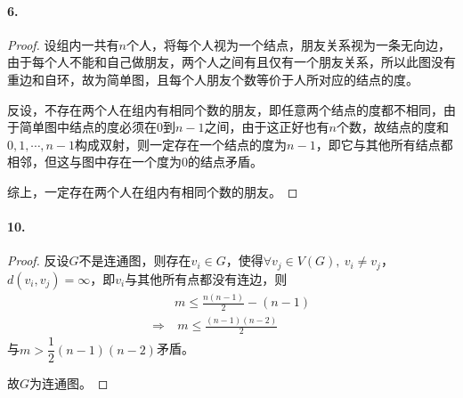 \documentclass[12pt, a4paper, oneside]{ctexart}
\begin{document}
\paragraph{6.}
\begin{proof}
    设组内一共有$n$个人，将每个人视为一个结点，朋友关系视为一条无向边，由于每个人不能和自己做朋友，两个人之间有且仅有一个朋友关系，所以此图没有重边和自环，故为简单图，且每个人朋友个数等价于人所对应的结点的度。

    反设，不存在两个人在组内有相同个数的朋友，即任意两个结点的度都不相同，由于简单图中结点的度必须在$0$到$n-1$之间，由于这正好也有$n$个数，故结点的度和$0,1,\cdots, n-1$构成双射，则一定存在一个结点的度为$n-1$，即它与其他所有结点都相邻，但这与图中存在一个度为$0$的结点矛盾。

    综上，一定存在两个人在组内有相同个数的朋友。
\end{proof}
\paragraph{10.}\begin{proof}
    反设$G$不是连通图，则存在$v_i\in G$，使得$\forall v_j \in V(G),\ v_i\neq v_j$，$d(v_i,v_j) = \infty$，即$v_i$与其他所有点都没有连边，则
    \begin{equation*}
        \begin{aligned}
            &m\leqslant \frac{n(n-1)}{2}-(n-1)\\
            \Rightarrow&\ m\leqslant \frac{(n-1)(n-2)}{2}
        \end{aligned}
    \end{equation*}
    与$m > \dfrac{1}{2}(n-1)(n-2)$矛盾。
    
    故$G$为连通图。
\end{proof}
\end{document}
